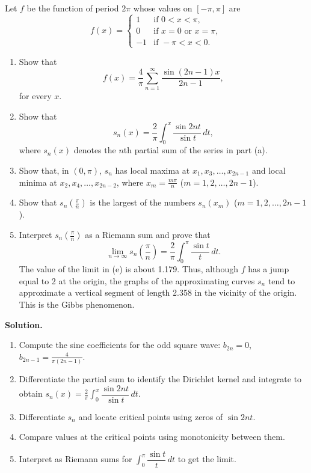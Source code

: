 \begin{problembox}
Let $f$ be the function of period $2\pi$ whose values on $[-\pi, \pi]$ are
\[
f(x) = 
\begin{cases} 
1 & \text{if } 0 < x < \pi, \\
0 & \text{if } x = 0 \text{ or } x = \pi, \\
-1 & \text{if } -\pi < x < 0.
\end{cases}
\]
\begin{enumerate}[label=(\alph*)]
\item Show that
\[
f(x) = \frac{4}{\pi} \sum_{n=1}^\infty \frac{\sin (2n - 1)x}{2n - 1},
\]
for every $x$.
\item Show that
\[
s_n(x) = \frac{2}{\pi} \int_0^x \frac{\sin 2nt}{\sin t} \, dt,
\]
where $s_n(x)$ denotes the $n$th partial sum of the series in part (a).
\item Show that, in $(0, \pi)$, $s_n$ has local maxima at $x_1, x_3, \dots, x_{2n-1}$ and local minima at $x_2, x_4, \dots, x_{2n-2}$, where $x_m = \frac{m\pi}{n}$ ($m = 1, 2, \dots, 2n - 1$).
\item Show that $s_n\left(\frac{\pi}{n}\right)$ is the largest of the numbers $s_n(x_m)$ ($m = 1, 2, \dots, 2n - 1$).
\item Interpret $s_n\left(\frac{\pi}{n}\right)$ as a Riemann sum and prove that
\[
\lim_{n \to \infty} s_n\left(\frac{\pi}{n}\right) = \frac{2}{\pi} \int_0^\pi \frac{\sin t}{t} \, dt.
\]
The value of the limit in (e) is about 1.179. Thus, although $f$ has a jump equal to 2 at the origin, the graphs of the approximating curves $s_n$ tend to approximate a vertical segment of length 2.358 in the vicinity of the origin. This is the Gibbs phenomenon.
\end{enumerate}
\end{problembox}

\noindent\textbf{Solution.}
\begin{enumerate}[label=(\alph*)]
\item Compute the sine coefficients for the odd square wave: $b_{2n}=0$, $b_{2n-1}=\tfrac{4}{\pi(2n-1)}$.
\item Differentiate the partial sum to identify the Dirichlet kernel and integrate to obtain $s_n(x)=\tfrac{2}{\pi}\int_0^x \dfrac{\sin 2nt}{\sin t}\,dt$.
\item Differentiate $s_n$ and locate critical points using zeros of $\sin 2nt$.
\item Compare values at the critical points using monotonicity between them.
\item Interpret as Riemann sums for $\int_0^{\pi} \dfrac{\sin t}{t}\,dt$ to get the limit.
\end{enumerate}

